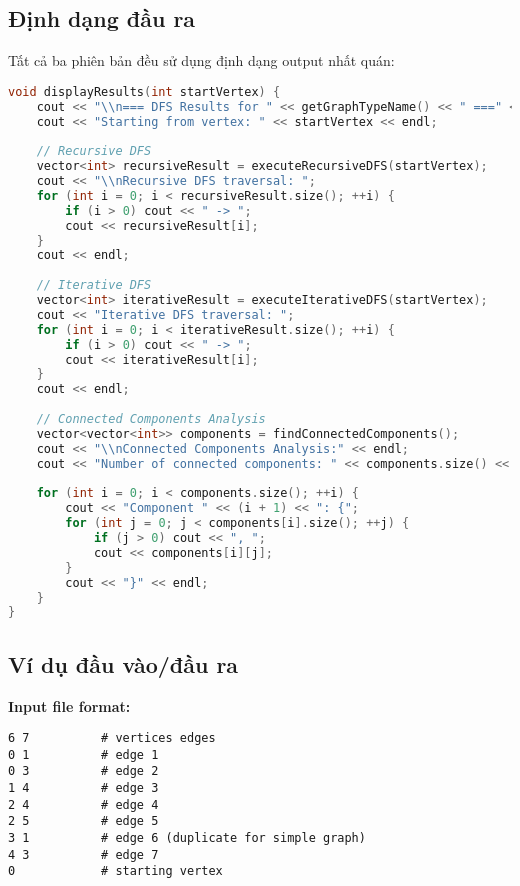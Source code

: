 \documentclass[12pt]{article}
\begin{document}
\subsection*{Định dạng đầu ra}

Tất cả ba phiên bản đều sử dụng định dạng output nhất quán:

\begin{lstlisting}[language=C++, basicstyle=\ttfamily\footnotesize, frame=single]
void displayResults(int startVertex) {
    cout << "\\n=== DFS Results for " << getGraphTypeName() << " ===" << endl;
    cout << "Starting from vertex: " << startVertex << endl;
    
    // Recursive DFS
    vector<int> recursiveResult = executeRecursiveDFS(startVertex);
    cout << "\\nRecursive DFS traversal: ";
    for (int i = 0; i < recursiveResult.size(); ++i) {
        if (i > 0) cout << " -> ";
        cout << recursiveResult[i];
    }
    cout << endl;
    
    // Iterative DFS
    vector<int> iterativeResult = executeIterativeDFS(startVertex);
    cout << "Iterative DFS traversal: ";
    for (int i = 0; i < iterativeResult.size(); ++i) {
        if (i > 0) cout << " -> ";
        cout << iterativeResult[i];
    }
    cout << endl;
    
    // Connected Components Analysis
    vector<vector<int>> components = findConnectedComponents();
    cout << "\\nConnected Components Analysis:" << endl;
    cout << "Number of connected components: " << components.size() << endl;
    
    for (int i = 0; i < components.size(); ++i) {
        cout << "Component " << (i + 1) << ": {";
        for (int j = 0; j < components[i].size(); ++j) {
            if (j > 0) cout << ", ";
            cout << components[i][j];
        }
        cout << "}" << endl;
    }
}
\end{lstlisting}

\subsection*{Ví dụ đầu vào/đầu ra}

\textbf{Input file format:}
\begin{verbatim}
6 7          # vertices edges
0 1          # edge 1
0 3          # edge 2
1 4          # edge 3
2 4          # edge 4
2 5          # edge 5
3 1          # edge 6 (duplicate for simple graph)
4 3          # edge 7
0            # starting vertex
\end{verbatim}
\end{document}
